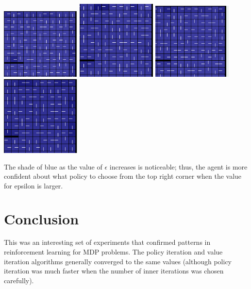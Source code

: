 \documentclass[11pt]{article}
\begin{document}
            \includegraphics[width=4cm]{../images/large/tr_eps0.PNG}
           \includegraphics[width=4cm]{../images/large/tr_eps01.PNG}
            \includegraphics[width=4cm]{../images/large/tr_eps02.PNG}
            \includegraphics[width=4cm]{../images/large/tr_eps05.PNG}

            The shade of blue as the value of $\epsilon$ increases is noticeable;
            thus, the agent is more confident about what policy to choose from the
            top right corner when the value for epsilon is larger.
            
        \section{Conclusion}

            This was an interesting set of experiments that confirmed patterns
            in reinforcement learning for MDP problems. The policy iteration
            and value iteration algorithms generally converged to the same
            values (although policy iteration was much faster when the number
            of inner iterations was chosen carefully).
\end{document}
